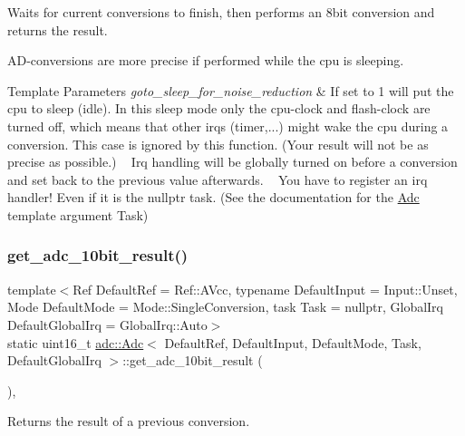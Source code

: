 Waits for current conversions to finish, then performs an 8bit conversion and returns the result. 

A\+D-\/conversions are more precise if performed while the cpu is sleeping.


\begin{DoxyTemplParams}{Template Parameters}
{\em goto\+\_\+sleep\+\_\+for\+\_\+noise\+\_\+reduction} & If set to 1 will put the cpu to sleep (idle). In this sleep mode only the cpu-\/clock and flash-\/clock are turned off, which means that other irqs (timer,...) might wake the cpu during a conversion. This case is ignored by this function. (Your result will not be as precise as possible.) ~\newline
 Irq handling will be globally turned on before a conversion and set back to the previous value afterwards. ~\newline
 You have to register an irq handler! Even if it is the nullptr task. (See the documentation for the \hyperlink{classadc_1_1Adc}{Adc} template argument Task) \\
\hline
\end{DoxyTemplParams}
\hypertarget{classadc_1_1Adc_a4b6ffdcd526be74e01f39329a5f25d20}{}\label{classadc_1_1Adc_a4b6ffdcd526be74e01f39329a5f25d20} 
\subsubsection{\texorpdfstring{get\+\_\+adc\+\_\+10bit\+\_\+result()}{get\_adc\_10bit\_result()}}
{\footnotesize\ttfamily template$<$Ref Default\+Ref = Ref\+::\+A\+Vcc, typename Default\+Input  = Input\+::\+Unset, Mode Default\+Mode = Mode\+::\+Single\+Conversion, task Task = nullptr, Global\+Irq Default\+Global\+Irq = Global\+Irq\+::\+Auto$>$ \\
static uint16\+\_\+t \hyperlink{classadc_1_1Adc}{adc\+::\+Adc}$<$ Default\+Ref, Default\+Input, Default\+Mode, Task, Default\+Global\+Irq $>$\+::get\+\_\+adc\+\_\+10bit\+\_\+result (\begin{DoxyParamCaption}{ }\end{DoxyParamCaption})\hspace{0.3cm}{\ttfamily [inline]}, {\ttfamily [static]}}



Returns the result of a previous conversion. 

